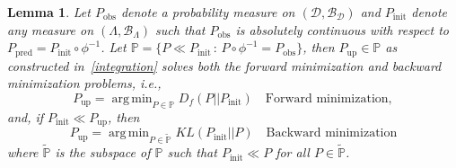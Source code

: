 \documentclass{article}
\newtheorem{lemma}{Lemma}[section]
\newcommand{\p}{\mathbb{P}}
\newcommand{\pspace}{\Lambda}
\newcommand{\dspace}{\mathcal{D}}
\newcommand{\pborel}{\mathcal{B}_{\pspace}}
\newcommand{\dborel}{\mathcal{B}_{\dspace}}
\newcommand{\initmeas}{P_{\text{init}}}
\newcommand{\updatemeas}{P_{\text{up}}}
\newcommand{\predictmeas}{P_\text{pred}}
\newcommand{\obsmeas}{P_{\text{obs}}}
\DeclareMathOperator*{\argmin}{arg\,min}
\begin{document}


\begin{lemma}\label{lemma:for_bac} 
Let $\obsmeas$ denote a probability measure on $(\dspace, \dborel)$ and $\initmeas$ denote any measure on $(\pspace,\pborel)$ such that $\obsmeas$ is absolutely continuous with respect to $\predictmeas=\initmeas\circ \phi^{-1}$. 
Let $\p = \{P\ll \initmeas\, : \, P\circ \phi^{-1} = \obsmeas\}$, then $\updatemeas\in \p$ as constructed in~\eqref{integration} solves both the forward minimization and backward minimization problems, i.e., 
\[
    \updatemeas = \argmin_{P\in \p} D_{f}(P || \initmeas) \quad \text{Forward minimization},
\]
and, if $\initmeas \ll \updatemeas$, then
\[
    \updatemeas = \argmin_{P\in \tilde{\p}} KL(\initmeas || P) \quad \text{Backward minimization}
\]
where $\tilde{\p}$ is the subspace of $\p$ such that $\initmeas \ll P$ for all $P\in\tilde{\p}$.
\end{lemma}
\end{document}
